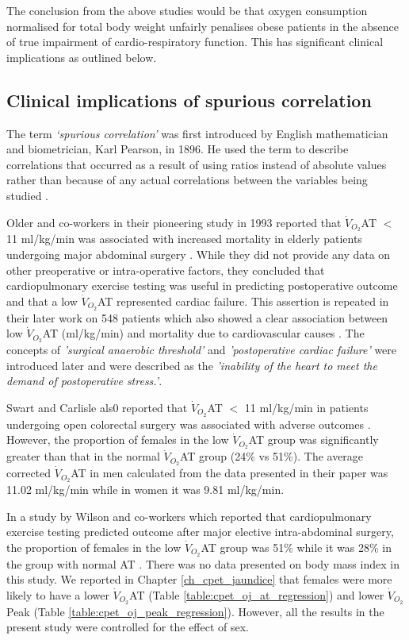 The conclusion from the above studies would be that oxygen consumption normalised for total body weight unfairly penalises obese patients in the absence of true impairment of cardio-respiratory function. 
This has significant clinical implications as outlined below.

\subsection{Clinical implications of spurious correlation}

The term \textit{`spurious correlation'} was first introduced by English mathematician and biometrician, Karl Pearson, in 1896. 
He used the term to describe correlations that occurred as a result of using ratios instead of absolute values rather than because of any actual correlations between the variables being studied \parencite{pearson_mathematical_1896}.

Older and co-workers in their pioneering study in 1993 reported that $\dot{V}_{O_2}$AT $<$ 11 ml/kg/min was associated with increased mortality in elderly patients undergoing major abdominal surgery \parencite{older_preoperative_1993}. 
While they did not provide any data on other preoperative or intra-operative factors, they concluded that cardiopulmonary exercise testing was useful in predicting postoperative outcome and that a low $\dot{V}_{O_2}$AT represented cardiac failure. 
This assertion is repeated in their later work on 548 patients which also showed a clear association between low $\dot{V}_{O_2}$AT (ml/kg/min) and mortality due to cardiovascular causes \parencite{older_cardiopulmonary_1999}. 
The concepts of \textit{'surgical anaerobic threshold'} and \textit{'postoperative cardiac failure'} were introduced later and were described as the \textit{'inability of the heart to meet the demand of postoperative stress.'}\parencite{society_ats/accp_2003}.

Swart and Carlisle als0 reported that $\dot{V}_{O_2}$AT $<$ 11 ml/kg/min in patients undergoing open colorectal surgery was associated with adverse outcomes \parencite{swart_case-controlled_2012}. 
However, the proportion of females in the low $\dot{V}_{O_2}$AT group was significantly greater than that in the normal $\dot{V}_{O_2}$AT group (24\% vs 51\%). 
The average corrected $\dot{V}_{O_2}$AT in men calculated from the data presented in their paper was 11.02 ml/kg/min while in women it was 9.81 ml/kg/min. 

In a study by Wilson and co-workers which reported that cardiopulmonary exercise testing predicted outcome after major elective intra-abdominal surgery, the proportion of females in the low $\dot{V}_{O_2}$AT group was 51\% while it was 28\% in the group with normal AT \parencite{wilson_impaired_2010}. 
There was no data presented on body mass index in this study. 
We reported in Chapter \ref{ch_cpet_jaundice} that females were more likely to have a lower $\dot{V}_{O_2}$AT (Table \ref{table:cpet_oj_at_regression}) and lower $\dot{V}_{O_2}$Peak (Table \ref{table:cpet_oj_peak_regression}). 
However, all the results in the present study were controlled for the effect of sex. 

